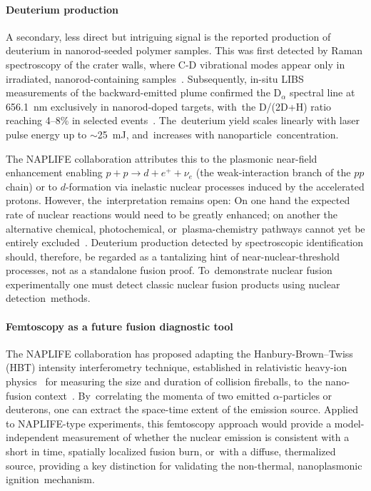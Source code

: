 \documentclass[particles,article,accept,pdftex,moreauthors]{Definitions/mdpi}
\begin{document}
\vspace{-6pt}\paragraph*{\bf Deuterium production}
A secondary, less direct but intriguing signal is the reported production of deuterium in nanorod-seeded polymer samples. This was first detected by Raman spectroscopy of the crater walls, where C-D vibrational modes appear only in irradiated, nanorod-containing samples~\cite{Csernai:2023PRE}. Subsequently, in-situ LIBS measurements of the backward-emitted plume confirmed the D$_\alpha$ spectral line at 656.1~nm exclusively in nanorod-doped targets, with~the D/(2D+H) ratio reaching 4--8\% in selected events~\cite{Kroo:2024SciRep}. The~deuterium yield scales linearly with laser pulse energy up to $\sim$25~mJ, and~increases with nanoparticle~concentration. 

The NAPLIFE collaboration attributes this to the plasmonic near-field enhancement enabling $p+p\to d+e^++\nu_e$ (the weak-interaction branch of the $pp$ chain) or to $d$-formation via inelastic nuclear processes induced by the accelerated protons. However, the~interpretation remains open: On one hand the expected rate of nuclear reactions would need to be greatly enhanced; on another the alternative chemical, photochemical, or~plasma-chemistry pathways cannot yet be entirely excluded~\cite{Kroo:2025HighField}. Deuterium production detected by spectroscopic identification should, therefore, be regarded as a tantalizing hint of near-nuclear-threshold processes, not as a standalone fusion proof. To~demonstrate nuclear fusion experimentally one must detect classic nuclear fusion products using nuclear detection~methods.

\vspace{-6pt}\paragraph*{\bf Femtoscopy as a future fusion diagnostic tool}
The NAPLIFE collaboration has proposed adapting the Hanbury-Brown--Twiss (HBT) intensity interferometry technique, established in relativistic heavy-ion physics~\cite{Baym:1997ce} for measuring the size and duration of collision fireballs, to~the nano-fusion context~\cite{Csernai:2024Universe}. By~correlating the momenta of two emitted $\alpha$-particles or deuterons, one can extract the space-time extent of the emission source. Applied to NAPLIFE-type experiments, this femtoscopy approach would provide a model-independent measurement of whether the nuclear emission is consistent with a short in time, spatially localized fusion burn, or~with a diffuse, thermalized source, providing a key distinction for validating the non-thermal, nanoplasmonic ignition~mechanism. 
\end{document}
